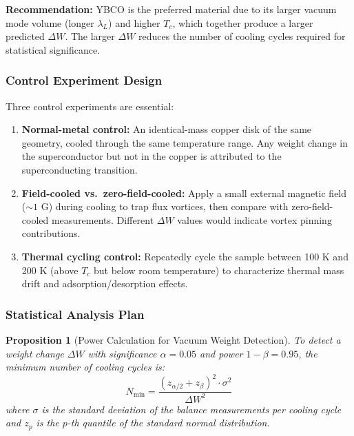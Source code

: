 \documentclass[11pt,a4paper]{article}
\newtheorem{proposition}{Proposition}
\begin{document}
\textbf{Recommendation:} YBCO is the preferred material due to its larger vacuum mode volume (longer $\lambda_L$) and higher $T_c$, which together produce a larger predicted $\Delta W$. The larger $\Delta W$ reduces the number of cooling cycles required for statistical significance.

\subsubsection{Control Experiment Design}

Three control experiments are essential:

\begin{enumerate}[leftmargin=1.5em]
  \item \textbf{Normal-metal control:} An identical-mass copper disk of the same geometry, cooled through the same temperature range. Any weight change in the superconductor but not in the copper is attributed to the superconducting transition.
  
  \item \textbf{Field-cooled vs.\ zero-field-cooled:} Apply a small external magnetic field ($\sim 1$ G) during cooling to trap flux vortices, then compare with zero-field-cooled measurements. Different $\Delta W$ values would indicate vortex pinning contributions.
  
  \item \textbf{Thermal cycling control:} Repeatedly cycle the sample between 100 K and 200 K (above $T_c$ but below room temperature) to characterize thermal mass drift and adsorption/desorption effects.
\end{enumerate}

\subsubsection{Statistical Analysis Plan}

\begin{proposition}[Power Calculation for Vacuum Weight Detection]
To detect a weight change $\Delta W$ with significance $\alpha = 0.05$ and power $1 - \beta = 0.95$, the minimum number of cooling cycles is:
\begin{equation}
  N_{\min} = \frac{(z_{\alpha/2} + z_\beta)^2 \cdot \sigma^2}{\Delta W^2}
  \label{eq:power}
\end{equation}
where $\sigma$ is the standard deviation of the balance measurements per cooling cycle and $z_p$ is the $p$-th quantile of the standard normal distribution.
\end{proposition}
\end{document}
